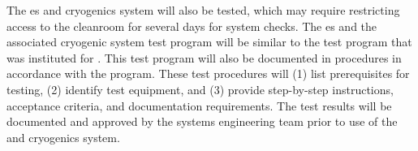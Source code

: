 The \coldbox{}es and cryogenics system will also be tested, which may require restricting  access to the cleanroom  %
for several days for system checks. 
The \coldbox{}es and the associated cryogenic system test program will be similar to the test program that was instituted for . 
This test program will also be documented in procedures in accordance with the    program. 
These test procedures will (1) list prerequisites for testing, (2) identify test equipment, and (3) provide step-by-step instructions, acceptance criteria, and documentation requirements.
 The test results will be documented and approved by the systems engineering team prior to use of the \coldbox and cryogenics system.

